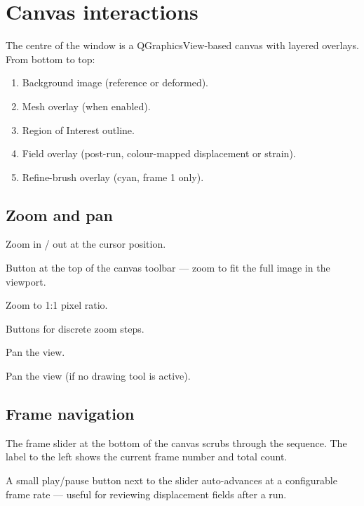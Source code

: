 \section{Canvas interactions}
\label{sec:canvas}

The centre of the window is a QGraphicsView-based canvas with
layered overlays. From bottom to top:

\begin{enumerate}
  \item Background image (reference or deformed).
  \item Mesh overlay (when enabled).
  \item Region of Interest outline.
  \item Field overlay (post-run, colour-mapped displacement or
        strain).
  \item Refine-brush overlay (cyan, frame 1 only).
\end{enumerate}

\subsection{Zoom and pan}

\begin{description}[leftmargin=1.2cm,style=nextline]
  \item[Mouse wheel] Zoom in / out at the cursor position.
  \item[Fit] Button at the top of the canvas toolbar --- zoom to fit
    the full image in the viewport.
  \item[100\%] Zoom to 1:1 pixel ratio.
  \item[+ / --] Buttons for discrete zoom steps.
  \item[Middle-click drag] Pan the view.
  \item[Left-click drag in empty area] Pan the view (if no drawing
    tool is active).
\end{description}

\subsection{Frame navigation}

The frame slider at the bottom of the canvas scrubs through the
sequence. The label to the left shows the current frame number and
total count.

A small play/pause button next to the slider auto-advances at a
configurable frame rate --- useful for reviewing displacement fields
after a run.

